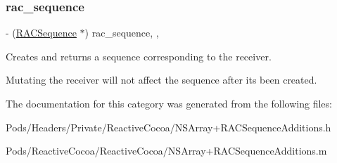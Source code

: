\subsubsection{\texorpdfstring{rac\+\_\+sequence}{rac\_sequence}}
{\footnotesize\ttfamily -\/ (\mbox{\hyperlink{interface_r_a_c_sequence}{R\+A\+C\+Sequence}} $\ast$) rac\+\_\+sequence\hspace{0.3cm}{\ttfamily [read]}, {\ttfamily [nonatomic]}, {\ttfamily [copy]}}

Creates and returns a sequence corresponding to the receiver.

Mutating the receiver will not affect the sequence after it\textquotesingle{}s been created. 

The documentation for this category was generated from the following files\+:\begin{DoxyCompactItemize}
\item 
Pods/\+Headers/\+Private/\+Reactive\+Cocoa/N\+S\+Array+\+R\+A\+C\+Sequence\+Additions.\+h\item 
Pods/\+Reactive\+Cocoa/\+Reactive\+Cocoa/N\+S\+Array+\+R\+A\+C\+Sequence\+Additions.\+m\end{DoxyCompactItemize}
